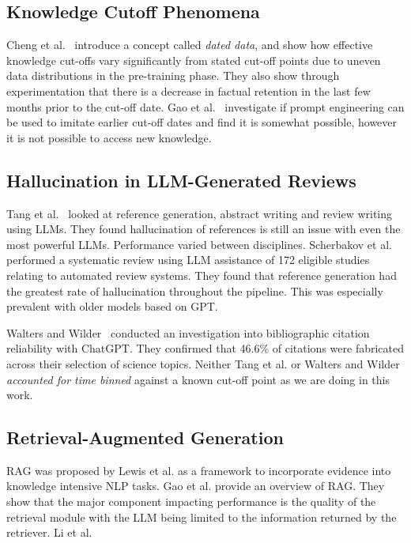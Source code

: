 \documentclass[conference]{IEEEtran}
\begin{document}
\subsection{Knowledge Cutoff Phenomena}
Cheng et al.~\cite{cheng2024} introduce a concept called \emph{dated data},
and show how effective knowledge cut-offs vary significantly from stated cut-off
points due to uneven data distributions in the pre-training phase. They also
show through experimentation that there is a decrease in factual retention in
the last few months prior to the cut-off date. Gao et al.~\cite{gao2025}
investigate if prompt engineering can be used to imitate earlier cut-off dates
and find it is somewhat possible, however it is not possible to access new
knowledge.

\subsection{Hallucination in LLM-Generated Reviews}

Tang et al.~\cite{tang2025} looked at reference generation, abstract writing and
review writing using LLMs. They found hallucination of references is still an issue
with even the most powerful LLMs. Performance varied between disciplines. Scherbakov et al.~\cite{scherbakov2025}
performed a systematic review using LLM assistance of 172 eligible studies relating
to automated review systems. They found that reference generation had the greatest
rate of hallucination throughout the pipeline. This was especially prevalent with
older models based on GPT.

Walters and Wilder~\cite{walters2023} conducted an investigation into bibliographic
citation reliability with ChatGPT. They confirmed that 46.6\%
of citations were fabricated across their selection of science topics. Neither
Tang et al. or Walters and Wilder \emph{
accounted for time binned} against a known cut-off point as we are doing in this
work.
\subsection{Retrieval-Augmented Generation}

RAG was proposed by Lewis et al.\cite{lewis2020} as a framework to incorporate
evidence into knowledge intensive NLP tasks. Gao et al.\cite{gao2024rag}
provide an overview of RAG. They show that the major component impacting
performance is the quality of the retrieval module with the LLM being limited to
the information returned by the retriever. Li et al.\cite{li2024}
\end{document}
